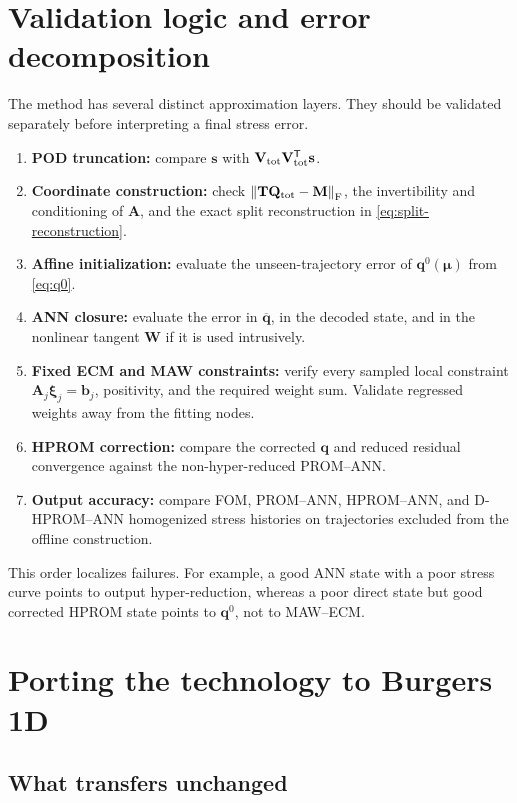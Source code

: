 \documentclass[11pt,a4paper]{article}
\newcommand{\transpose}{^{\mathsf T}}
\newcommand{\frobnorm}[1]{\left\lVert #1 \right\rVert_{\mathrm F}}
\newcommand{\vect}[1]{\mathbf{#1}}
\newcommand{\mat}[1]{\mathbf{#1}}
\begin{document}
\section{Validation logic and error decomposition}
\label{sec:validation}

The method has several distinct approximation layers.  They should be
validated separately before interpreting a final stress error.
\begin{enumerate}[label=\arabic*.,leftmargin=8mm]
  \item \textbf{POD truncation:} compare \(\vect s\) with
  \(\mat V_{\rm tot}\mat V_{\rm tot}\transpose\vect s\).
  \item \textbf{Coordinate construction:} check
  \(\frobnorm{\mat T\mat Q_{\rm tot}-\mat M}\), the invertibility and
  conditioning of \(\mat A\), and the exact split reconstruction in
  \cref{eq:split-reconstruction}.
  \item \textbf{Affine initialization:} evaluate the unseen-trajectory error
  of \(\vect q^0(\vect\mu)\) from \cref{eq:q0}.
  \item \textbf{ANN closure:} evaluate the error in
  \(\overline{\vect q}\), in the decoded state, and in the nonlinear tangent
  \(\mat W\) if it is used intrusively.
  \item \textbf{Fixed ECM and MAW constraints:} verify every sampled local
  constraint \(\mat A_j\vect\xi_j=\vect b_j\), positivity, and the required
  weight sum.  Validate regressed weights away from the fitting nodes.
  \item \textbf{HPROM correction:} compare the corrected \(\vect q\) and
  reduced residual convergence against the non-hyper-reduced PROM--ANN.
  \item \textbf{Output accuracy:} compare FOM, PROM--ANN, HPROM--ANN, and
  D-HPROM--ANN homogenized stress histories on trajectories excluded from
  the offline construction.
\end{enumerate}

This order localizes failures.  For example, a good ANN state with a poor
stress curve points to output hyper-reduction, whereas a poor direct state but
good corrected HPROM state points to \(\vect q^0\), not to MAW--ECM.

\section{Porting the technology to Burgers 1D}
\label{sec:burgers}

\subsection{What transfers unchanged}
\end{document}
